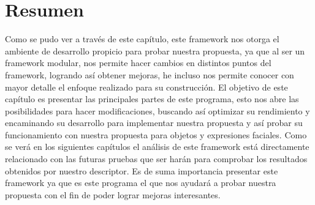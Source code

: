 \section{Resumen}\label{sec:summaryIV}

Como se pudo ver a través de este capítulo, este framework nos otorga el ambiente de desarrollo propicio para probar nuestra propuesta, ya que al ser un framework modular, nos permite hacer cambios en distintos puntos del framework, logrando así obtener mejoras, he incluso nos permite conocer con mayor detalle el enfoque realizado para su construcción.
El objetivo de este capítulo es presentar las principales partes de este programa, esto nos abre las posibilidades para hacer modificaciones, buscando así optimizar su rendimiento y encaminando su desarrollo para implementar nuestra propuesta y así probar su funcionamiento con nuestra propuesta para objetos y expresiones faciales. Como se verá en los siguientes capítulos el análisis de este framework está directamente relacionado con las futuras pruebas que ser harán para comprobar los resultados obtenidos por nuestro descriptor. Es de suma importancia presentar este framework ya que es este programa el que nos ayudará a probar nuestra propuesta con el fin de poder lograr mejoras interesantes.



